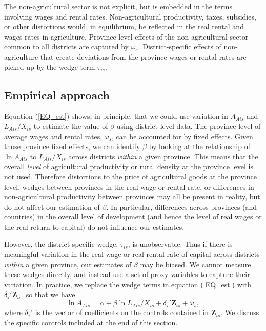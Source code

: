 The non-agricultural sector is not explicit, but is embedded in the terms involving wages and rental rates. Non-agricultural productivity, taxes, subsidies, or other distortions would, in equilibrium, be reflected in the real rental and wages rates in agriculture. Province-level effects of the non-agricultural sector common to all districts are captured by $\omega_s$. District-specific effects of non-agriculture that create deviations from the province wages or rental rates are picked up by the wedge term $\tau_{is}$.

\subsection{Empirical approach}
Equation (\ref{EQ_est}) shows, in principle, that we could use variation in $A_{Ais}$ and $L_{Ais}/X_{is}$ to estimate the value of $\beta$ using district level data. The province level of average wages and rental rates, $\omega_s$, can be accounted for by fixed effects. Given those province fixed effects, we can identify $\beta$ by looking at the relationship of $\ln A_{Ais}$ to $L_{Ais}/X_{is}$ across districts \textit{within} a given province. This means that the overall \textit{level} of agricultural productivity or rural density at the province level is not used. Therefore distortions to the price of agricultural goods at the province level, wedges between provinces in the real wage or rental rate, or differences in non-agricultural productivity between provinces may all be present in reality, but do not affect our estimation of $\beta$. In particular, differences across provinces (and countries) in the overall level of development (and hence the level of real wages or the real return to capital) do not influence our estimates.

However, the district-specific wedge, $\tau_{is}$, is unobservable. Thus if there is meaningful variation in the real wage or real rental rate of capital across districts \textit{within} a given province, our estimates of $\beta$ may be biased. We cannot measure these wedges directly, and instead use a set of proxy variables to capture their variation. In practice, we replace the wedge terms in equation (\ref{EQ_est}) with $\delta_{\tau}' \mathbf{Z}_{is}$, so that we have
\begin{equation}
	\ln A_{Ais} = \alpha + \beta \ln L_{Ais}/X_{is} + \delta_{\tau}' \mathbf{Z}_{is} + \omega_s, \label{EQ_Omega}
\end{equation}
where $\delta_{\tau}'$ is the vector of coefficients on the controls contained in $\mathbf{Z}_{is}$. We discuss the specific controls included at the end of this section.

